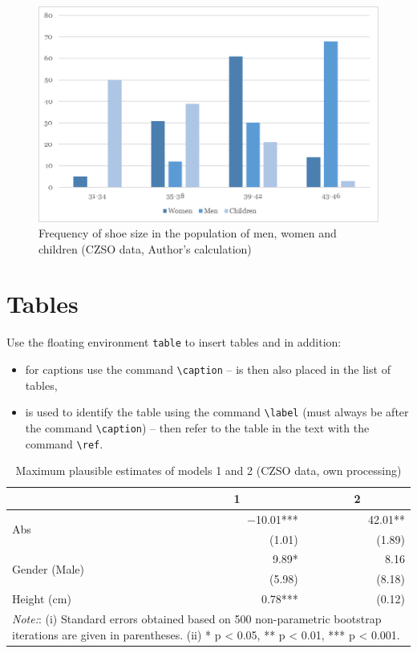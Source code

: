 \begin{figure}[htbp!]\centering
\includegraphics[width=.66\textwidth]{img/example-fig}
\caption{Frequency of shoe size in the population of men, women and children (CZSO data, Author’s calculation)}
\label{fig:freq-shoe-size}
\end{figure}


\section{Tables}

Use the floating environment \verb|table| to insert tables and in addition:
\begin{itemize}
\item for captions use the command \verb|\caption| -- is then also placed in the list of tables,
\item is used to identify the table using the command \verb|\label| (must always be after the command \verb|\caption|) -- then refer to the table in the text with the command \verb|\ref|.
\end{itemize}

\begin{table}[htbp!]

\centering

\caption{Maximum plausible estimates of models 1 and 2 (CZSO data, own processing)}\label{tab03:Nejaka}
\begin{tabular}{lrr}
\toprule
 & \multicolumn{1}{c}{\textbf{1}} & \multicolumn{1}{c}{\textbf{2}}\\
\midrule
\multirow{2}{*}{Abs} &$-$10.01*** &42.01**\\
 & (1.01) &(1.89)\\
\multirow{2}{*}{Gender (Male)} & 9.89* & 8.16\\
 & (5.98) &(8.18)\\
Height (cm) & 0.78*** &(0.12) \\
\bottomrule
\multicolumn{3}{p{.45\textwidth}}{\footnotesize \textit{Note:}:
(i) Standard errors obtained based on 500 non-parametric bootstrap iterations are given in parentheses.
(ii) * p < 0.05, ** p < 0.01, *** p < 0.001.}
\end{tabular}
\end{table}

